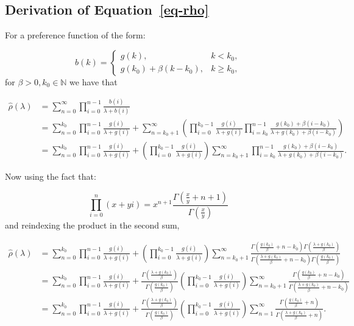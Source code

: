 \documentclass[
  sn-basic,
]{sn-jnl}
\theoremstyle{plain}
\theoremstyle{plain}
\theoremstyle{remark}
\begin{document}
\subsection{\texorpdfstring{Derivation of
Equation~\ref{eq-rho}}{Derivation of Equation~}}\label{derivation-of-eq-rho}

For a preference function of the form:

\[
b(k) = \begin{cases}
g(k),&k<k_0,\\
g(k_0) + \beta(k-k_0), &k\ge k_0,
\end{cases}
\] for \(\beta>0, k_0\in\mathbb N\) we have that

\begin{align*}
\hat\rho(\lambda) &= \sum_{n=0}^\infty\prod_{i=0}^{n-1}\frac{b(i)}{\lambda+b(i)}\\ &= \sum_{n=0}^{k_0}\prod_{i=0}^{n-1}\frac{g(i)}{\lambda+g(i)} + \sum_{n=k_0+1}^\infty\left(\prod_{i=0}^{k_0-1}\frac{g(i)}{\lambda+g(i)}\prod_{i=k_0}^{n-1}\frac{g(k_0) + \beta(i-k_0)}{\lambda +g(k_0) + \beta(i-k_0)}\right)\\
&=\sum_{n=0}^{k_0}\prod_{i=0}^{n-1}\frac{g(i)}{\lambda+g(i)} + \left(\prod_{i=0}^{k_0-1}\frac{g(i)}{\lambda+g(i)}\right)\sum_{n=k_0+1}^\infty\prod_{i=k_0}^{n-1}\frac{g(k_0) + \beta(i-k_0)}{\lambda +g(k_0) + \beta(i-k_0)}.
\end{align*}

Now using the fact that:

\[
\prod_{i=0}^n(x+yi) = x^{n+1}\frac{\Gamma\left(\frac{x}{y}+n+1\right)}{\Gamma\left(\frac{x}{y}\right)}
\] and reindexing the product in the second sum,

\begin{align*}
\hat\rho(\lambda) &= \sum_{n=0}^{k_0}\prod_{i=0}^{n-1}\frac{g(i)}{\lambda+g(i)} + \left(\prod_{i=0}^{k_0-1}\frac{g(i)}{\lambda+g(i)}\right)\sum_{n=k_0+1}^\infty\frac{\Gamma\left(\frac{g(k_0)}{\beta}+n-k_0\right)\Gamma\left(\frac{\lambda+g(k_0)}{\beta}\right)}{\Gamma\left(\frac{\lambda+g(k_0)}{\beta}+n-k_0\right)\Gamma\left(\frac{g(k_0)}{\beta}\right)}\\
&= \sum_{n=0}^{k_0}\prod_{i=0}^{n-1}\frac{g(i)}{\lambda+g(i)} + \frac{\Gamma\left(\frac{\lambda+g(k_0)}{\beta}\right)}{\Gamma\left(\frac{g(k_0)}{\beta}\right)}\left(\prod_{i=0}^{k_0-1}\frac{g(i)}{\lambda+g(i)}\right)\sum_{n=k_0+1}^\infty\frac{\Gamma\left(\frac{g(k_0)}{\beta}+n-k_0\right)}{\Gamma\left(\frac{\lambda+g(k_0)}{\beta}+n-k_0\right)}\\
&=\sum_{n=0}^{k_0}\prod_{i=0}^{n-1}\frac{g(i)}{\lambda+g(i)} + \frac{\Gamma\left(\frac{\lambda+g(k_0)}{\beta}\right)}{\Gamma\left(\frac{g(k_0)}{\beta}\right)}\left(\prod_{i=0}^{k_0-1}\frac{g(i)}{\lambda+g(i)}\right)\sum_{n=1}^\infty\frac{\Gamma\left(\frac{g(k_0)}{\beta}+n\right)}{\Gamma\left(\frac{\lambda+g(k_0)}{\beta}+n\right)}.
\end{align*}
\end{document}
